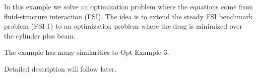 In this example we solve an optimization problem where 
the equations come from fluid-structure interaction (FSI). The idea
is to extend the steady FSI benchmark problem (FSI 1) to an optimization 
problem where the drag is minimized over the cylinder plus beam. 

The example has many similarities to Opt Example 3.

Detailed description will follow later.
